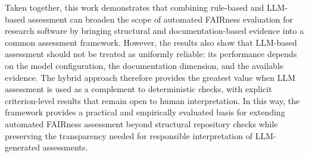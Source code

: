 Taken together, this work demonstrates that combining rule-based and
LLM-based assessment can broaden the scope of automated FAIRness
evaluation for research software by bringing structural and
documentation-based evidence into a common assessment framework.
However, the results also show that LLM-based assessment should not
be treated as uniformly reliable: its performance depends on the
model configuration, the documentation dimension, and the available
evidence. The hybrid approach therefore provides the greatest value
when LLM assessment is used as a complement to deterministic checks,
with explicit criterion-level results that remain open to human
interpretation. In this way, the framework provides a practical and
empirically evaluated basis for extending automated FAIRness
assessment beyond structural repository checks while preserving the
transparency needed for responsible interpretation of LLM-generated
assessments.
